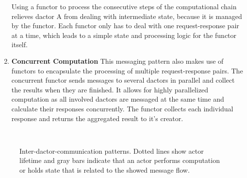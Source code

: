 \begin{enumerate}
        Using a \gls{functor} to process the consecutive steps of the computational chain relieves \gls{dactor} A from dealing with intermediate state, because it is managed by the \gls{functor}.
        Each \gls{functor} only has to deal with one request-response pair at a time, which leads to a simple state and processing logic for the \gls{functor} itself.

      \item\label{enum:comp_pattern_3} \textbf{Concurrent Computation}
        This messaging pattern also makes use of \glspl{functor} to encapsulate the processing of multiple request-response pairs.
        The concurrent \gls{functor} sends messages to several \glspl{dactor} in parallel and collect the results when they are finished.
        It allows for highly parallelized computation as all involved \glspl{dactor} are messaged at the same time and calculate their responses concurrently.
        The \gls{functor} collects each individual response and returns the aggregated result to it's creator.
    \end{enumerate}

    \begin{figure}
      \centering

      \begin{subfigure}[c]{0.49\textwidth}
        
        \label{fig:comp_pattern_1}
        \hfill\\
        
        \label{fig:comp_pattern_3}
      \end{subfigure}
      \begin{subfigure}[c]{0.5\textwidth}
        
        \label{fig:comp_pattern_2}
      \end{subfigure}
      \caption{Inter-\gls{dactor}-communication patterns. Dotted lines show actor lifetime and gray bars indicate that an actor performs computation or holds state that is related to the showed message flow.}
      \label{fig:comp_patterns}
    \end{figure}


